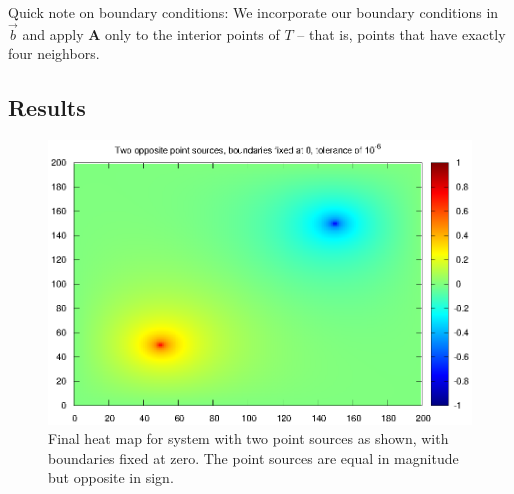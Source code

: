 \documentclass[paper=a4, fontsize=11pt]{scrartcl} %
\numberwithin{equation}{section} %
\numberwithin{figure}{section} %
\numberwithin{table}{section} %
\newcommand{\matr}[1]{\mathbf{#1}}
\begin{document}
Quick note on boundary conditions: We incorporate our boundary conditions in $\vec{b}$ and apply $\matr{A}$ only to the interior points of $T$ -- that is, points that have exactly four neighbors.

\subsection{Results}

\begin{figure}
\centering
\includegraphics[width=120mm]{heatmap1.eps}
\caption{Final heat map for system with two point sources as shown, with boundaries fixed at zero. The point sources are equal in magnitude but opposite in sign.}
\label{fig:cgheatmap}
\end{figure}
\end{document}
